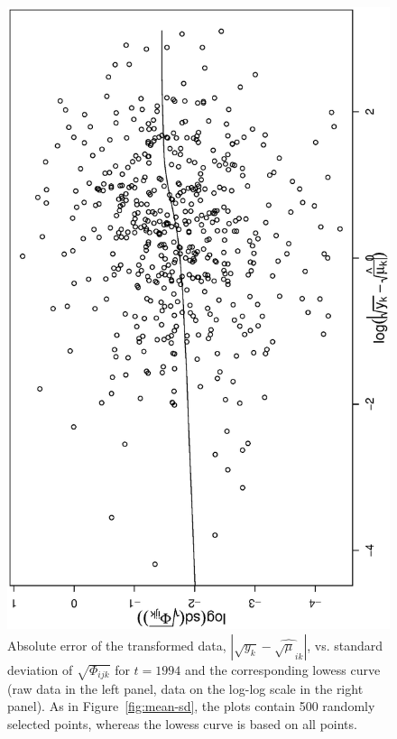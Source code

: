 \documentclass[11pt, fleqn]{article}
\begin{document}
\begin{figure}[t]
\begin{center}
\begin{minipage}{8cm}
\end{minipage}
\hfill
\begin{minipage}{8cm}
\includegraphics[scale=0.3, angle=-90]{pic/hu_lmean_lsd_all_sigmai_tran.ps}
\end{minipage}
\caption{\label{fig:mean-sd-sigmai-tran}\small Absolute error of the
  transformed data, $|\sqrt{y_k} - \hat{\sqrt{\mu}_{ik}}|$, vs. standard
  deviation of $\sqrt{\Phi_{ijk}}$ for $t=1994$ and the corresponding lowess
  curve (raw data in the left panel, data on the log-log scale in the right
  panel). As in Figure~\ref{fig:mean-sd}, the plots contain 500 randomly
  selected points, whereas the lowess curve is based on all points.}
\end{center}
\end{figure}
\end{document}
